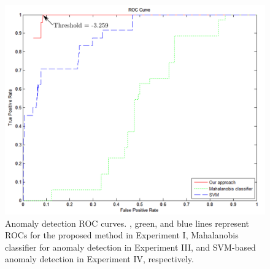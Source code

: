 \begin{figure}[t]
  \centering
  \includegraphics[width=0.8\linewidth]{figures/roc-ours-vs-ml-results}
  \caption[Anomaly detection ROC curves. Solid red, dotted green, and dashed 
    blue lines represent ROCs for the proposed method in Experiment I, 
    Mahalanobis classifier for anomaly detection in Experiment III, 
    and SVM-based anomaly
    detection in Experiment IV, respectively.]{\small Anomaly
    detection ROC curves. \DIFdelbeginFL {}\DIFdelendFL \DIFaddbeginFL {}\DIFaddendFL , \DIFaddbeginFL {}\DIFaddendFL green, and \DIFaddbeginFL {}\DIFaddendFL blue lines 
    represent ROCs for the proposed method in Experiment I, Mahalanobis 
    classifier for anomaly
    detection in Experiment III, and SVM-based anomaly detection 
    in Experiment IV, respectively.}
  \label{fig:batch-roc-results}
\end{figure}

